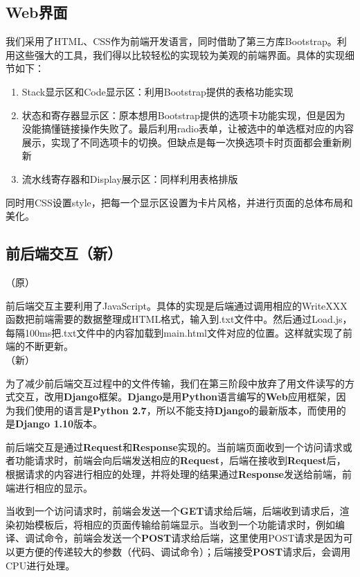 \documentclass[12pt]{article} %
\begin{document}
\begin{sloppypar}
\subsection{Web界面}

我们采用了HTML、CSS作为前端开发语言，同时借助了第三方库Bootstrap。利用这些强大的工具，我们得以比较轻松的实现较为美观的前端界面。具体的实现细节如下：

\begin{enumerate}
\item Stack显示区和Code显示区：利用Bootstrap提供的表格功能实现
\item 状态和寄存器显示区：原本想用Bootstrap提供的选项卡功能实现，但是因为没能搞懂链接操作失败了。最后利用radio表单，让被选中的单选框对应的内容展示，实现了不同选项卡的切换。但缺点是每一次换选项卡时页面都会重新刷新
\item 流水线寄存器和Display展示区：同样利用表格排版
\end{enumerate}

同时用CSS设置style，把每一个显示区设置为卡片风格，并进行页面的总体布局和美化。

\subsection{前后端交互（新）}

（原）

前后端交互主要利用了JavaScript。具体的实现是后端通过调用相应的WriteXXX函数把前端需要的数据整理成HTML格式，输入到.txt文件中。然后通过Load.js，每隔100ms把.txt文件中的内容加载到main.html文件对应的位置。这样就实现了前端的不断更新。\\

（新）

为了减少前后端交互过程中的文件传输，我们在第三阶段中放弃了用文件读写的方式交互，改用{\bf Django}框架。{\bf Django}是用{\bf Python}语言编写的{\bf Web}应用框架，因为我们使用的语言是{\bf Python 2.7}，所以不能支持{\bf Django}的最新版本，而使用的是{\bf Django 1.10}版本。

前后端交互是通过{\bf Request}和{\bf Response}实现的。当前端页面收到一个访问请求或者功能请求时，前端会向后端发送相应的{\bf Request}，后端在接收到{\bf Request}后，根据请求的内容进行相应的处理，并将处理的结果通过{\bf Response}发送给前端，前端进行相应的显示。

当收到一个访问请求时，前端会发送一个{\bf GET}请求给后端，后端收到请求后，渲染初始模板后，将相应的页面传输给前端显示。当收到一个功能请求时，例如编译、调试命令，前端会发送一个{\bf POST}请求给后端，这里使用POST请求是因为可以更方便的传递较大的参数（代码、调试命令）；后端接受{\bf POST}请求后，会调用CPU进行处理。


\end{sloppypar}
\end{document}
